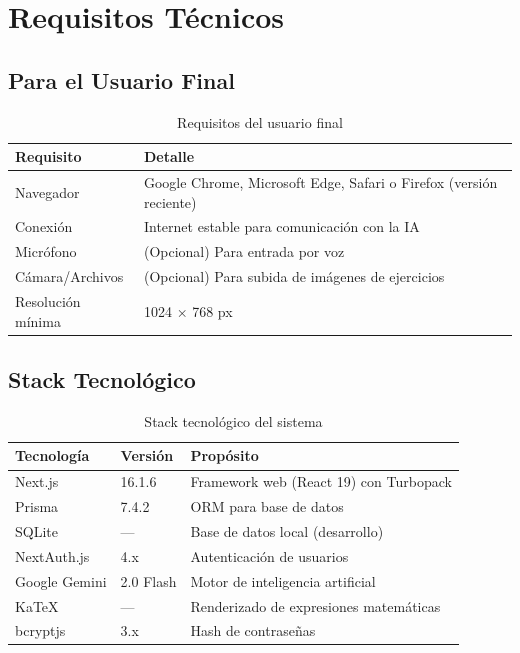 \documentclass[12pt, a4paper, oneside]{book}
\begin{document}
\chapter{Requisitos Técnicos}

\section{Para el Usuario Final}

\begin{table}[H]
\centering
\renewcommand{\arraystretch}{1.3}
\begin{tabularx}{\textwidth}{l X}
    \toprule
    \textbf{Requisito} & \textbf{Detalle} \\
    \midrule
    Navegador & Google Chrome, Microsoft Edge, Safari o Firefox (versión reciente) \\
    Conexión & Internet estable para comunicación con la IA \\
    Micrófono & (Opcional) Para entrada por voz \\
    Cámara/Archivos & (Opcional) Para subida de imágenes de ejercicios \\
    Resolución mínima & 1024 × 768 px \\
    \bottomrule
\end{tabularx}
\caption{Requisitos del usuario final}
\end{table}

\section{Stack Tecnológico}

\begin{table}[H]
\centering
\renewcommand{\arraystretch}{1.3}
\begin{tabularx}{\textwidth}{l l X}
    \toprule
    \textbf{Tecnología} & \textbf{Versión} & \textbf{Propósito} \\
    \midrule
    Next.js & 16.1.6 & Framework web (React 19) con Turbopack \\
    Prisma & 7.4.2 & ORM para base de datos \\
    SQLite & --- & Base de datos local (desarrollo) \\
    NextAuth.js & 4.x & Autenticación de usuarios \\
    Google Gemini & 2.0 Flash & Motor de inteligencia artificial \\
    KaTeX & --- & Renderizado de expresiones matemáticas \\
    bcryptjs & 3.x & Hash de contraseñas \\
    \bottomrule
\end{tabularx}
\caption{Stack tecnológico del sistema}
\end{table}
\end{document}
